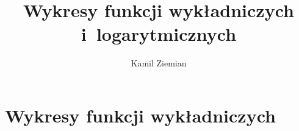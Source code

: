 \documentclass[a4paper,11pt]{article}
\title{Wykresy funkcji wykładniczych i~logarytmicznych}
\author{Kamil Ziemian}
\numberwithin{equation}{section}
\begin{document}





\maketitle





\section{Wykresy funkcji wykładniczych}

\label{sec:Funkcje-wykladnicze}
\end{document}

